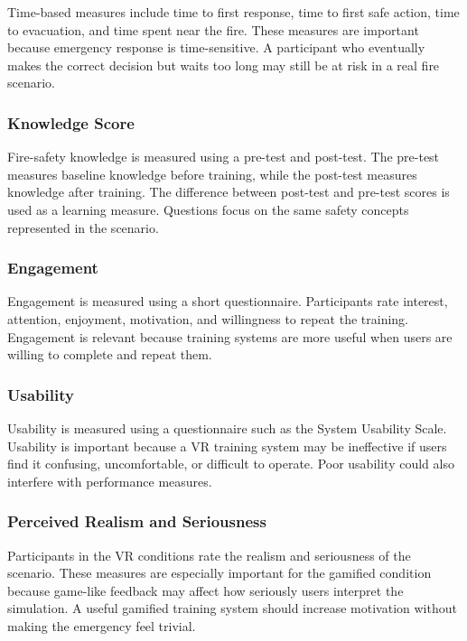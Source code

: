 \documentclass[manuscript, review]{acmart}
\begin{document}
{Time-based measures include time to first response, time to first safe action, time to evacuation, and time spent near the fire. These measures are important because emergency response is time-sensitive. A participant who eventually makes the correct decision but waits too long may still be at risk in a real fire scenario.

\subsubsection{Knowledge Score}

Fire-safety knowledge is measured using a pre-test and post-test. The pre-test measures baseline knowledge before training, while the post-test measures knowledge after training. The difference between post-test and pre-test scores is used as a learning measure. Questions focus on the same safety concepts represented in the scenario.

\subsubsection{Engagement}

Engagement is measured using a short questionnaire. Participants rate interest, attention, enjoyment, motivation, and willingness to repeat the training. Engagement is relevant because training systems are more useful when users are willing to complete and repeat them.

\subsubsection{Usability}

Usability is measured using a questionnaire such as the System Usability Scale. Usability is important because a VR training system may be ineffective if users find it confusing, uncomfortable, or difficult to operate. Poor usability could also interfere with performance measures.

\subsubsection{Perceived Realism and Seriousness}

Participants in the VR conditions rate the realism and seriousness of the scenario. These measures are especially important for the gamified condition because game-like feedback may affect how seriously users interpret the simulation. A useful gamified training system should increase motivation without making the emergency feel trivial.

}
\end{document}
